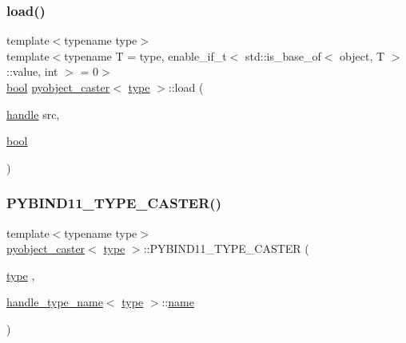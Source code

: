 \mbox{\label{structpyobject__caster_a68cb5b39f3864f5a6c13bc0b99ad3a3b}} 
\subsubsection{\texorpdfstring{load()}{load()}\hspace{0.1cm}{\footnotesize\ttfamily [2/2]}}
{\footnotesize\ttfamily template$<$typename type$>$ \\
template$<$typename T  = type, enable\+\_\+if\+\_\+t$<$ std\+::is\+\_\+base\+\_\+of$<$ object, T $>$\+::value, int $>$  = 0$>$ \\
\mbox{\hyperlink{asdl_8h_af6a258d8f3ee5206d682d799316314b1}{bool}} \mbox{\hyperlink{structpyobject__caster}{pyobject\+\_\+caster}}$<$ \mbox{\hyperlink{_s_d_l__opengl_8h_ad5ddf6fca7b585646515660e810e0188}{type}} $>$\+::load (\begin{DoxyParamCaption}\item[{\mbox{\hyperlink{classhandle}{handle}}}]{src,  }\item[{\mbox{\hyperlink{asdl_8h_af6a258d8f3ee5206d682d799316314b1}{bool}}}]{ }\end{DoxyParamCaption})\hspace{0.3cm}{\ttfamily [inline]}}

\mbox{\label{structpyobject__caster_a2dcaf6b5349d7059d76995b0dd716579}} 
\subsubsection{\texorpdfstring{PYBIND11\_TYPE\_CASTER()}{PYBIND11\_TYPE\_CASTER()}}
{\footnotesize\ttfamily template$<$typename type$>$ \\
\mbox{\hyperlink{structpyobject__caster}{pyobject\+\_\+caster}}$<$ \mbox{\hyperlink{_s_d_l__opengl_8h_ad5ddf6fca7b585646515660e810e0188}{type}} $>$\+::P\+Y\+B\+I\+N\+D11\+\_\+\+T\+Y\+P\+E\+\_\+\+C\+A\+S\+T\+ER (\begin{DoxyParamCaption}\item[{\mbox{\hyperlink{_s_d_l__opengl_8h_ad5ddf6fca7b585646515660e810e0188}{type}}}]{,  }\item[{\mbox{\hyperlink{structhandle__type__name}{handle\+\_\+type\+\_\+name}}$<$ \mbox{\hyperlink{_s_d_l__opengl_8h_ad5ddf6fca7b585646515660e810e0188}{type}} $>$\+::\mbox{\hyperlink{structname}{name}}}]{ }\end{DoxyParamCaption})}



